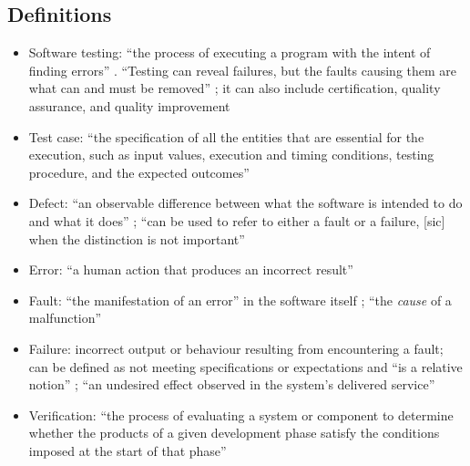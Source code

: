 \testReqsTable{}

\subsection{Definitions}

\begin{itemize}
      \item Software testing: ``the process of executing a program with the
            intent of finding errors'' \citep[p.~438]{PetersAndPedrycz2000}
            . ``Testing can reveal
            failures, but the faults causing them are what can and must be
            removed'' \citep[p.~5-3]{SWEBOK2024}; it can also include
            certification, quality assurance, and quality improvement
            \citep[p.~5-4]{SWEBOK2024}
      \item Test case: ``the specification of all the entities
            that are essential for the execution, such as input values,
            execution and timing conditions, testing procedure, and the
            expected outcomes'' \citep[pp.~5-1 to 5-2]{SWEBOK2024}
      \item Defect: ``an observable difference between what the software is
            intended to do and what it does'' \citep[p.~1-1]{SWEBOK2024}; ``can
            be used to refer to either a fault or a failure, [sic] when the
            distinction is not important'' \citep[p.~4-3]{SWEBOK2014}
      \item Error: ``a human action that produces an incorrect result''
            \citep[p.~399]{vanVliet2000}
      \item Fault: ``the manifestation of an error'' in the software itself
            \citep[p.~400]{vanVliet2000}; ``the \emph{cause} of a malfunction''
            \citep[p.~5-3]{SWEBOK2024}
      \item Failure: incorrect output or behaviour resulting from encountering
            a fault; can be defined as not meeting specifications or
            expectations and ``is a relative notion''
            \citep[p.~400]{vanVliet2000}; ``an undesired effect observed in the
            system's delivered service'' \citep[p.~5-3]{SWEBOK2024}
      \item Verification: ``the process of evaluating a system or component
            to determine whether the products of a given development phase
            satisfy the conditions imposed at the start of that phase''
            \citep[p.~400]{vanVliet2000}

\end{itemize}
